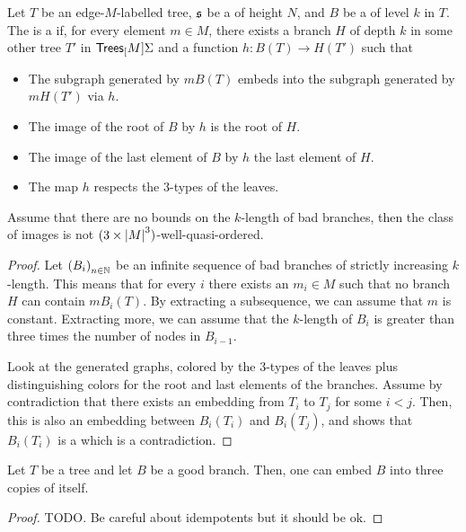 \begin{definition}
    \label{good-bough:def}
    Let $T$ be an edge-$M$-labelled tree, $\mathfrak{s}$ be a 
    of height $N$, and $B$ be a  of level $k$ in $T$.
    The  is a  if, for every element $m \in M$,
    there exists a branch $H$ of depth $k$ in some other tree $T'$ in $\mathsf{Trees}_{[}M]{\Sigma}$
    and a function $h \colon B(T) \to H(T')$ such that
    \begin{itemize}
        \item The subgraph generated by $m B(T)$ embeds into the subgraph generated by $m H(T')$ via $h$.
        \item The image of the root of $B$ by $h$ is the root of $H$.
        \item The image of the last element of $B$ by $h$ the last element of $H$.
        \item The map $h$ respects the $3$-types of the leaves.
    \end{itemize}
\end{definition}

\begin{lemma}
    Assume that there are no bounds on the $k$-length of bad branches, then 
    the class of images is not $(3 \times \left| M \right|^3)$-well-quasi-ordered.
\end{lemma}
\begin{proof}
    Let $\seqof{B_i}$ be an infinite sequence of bad branches of strictly increasing $k$-length.
    This means that for every $i$ there exists an $m_i \in M$ such that
    no branch $H$ can contain $m B_i(T)$. By extracting a subsequence, we can assume that $m$ is constant.
    Extracting more, we can assume that the $k$-length of $B_i$ is greater than three times the
    number of nodes in $B_{i-1}$.

    Look at the generated graphs, colored by the $3$-types of the leaves plus
    distinguishing colors for the root and last elements of the branches. Assume by contradiction that
    there exists an embedding from $T_i$ to $T_j$ for some $i < j$. Then,
    this is also an embedding between $B_i(T_i)$ and $B_i(T_j)$, and
    shows that $B_i(T_i)$ is a  which is a contradiction.
\end{proof}

\begin{lemma}
    Let $T$ be a tree and let $B$ be a good branch. Then, one can embed     
    $B$ into three copies of itself.
\end{lemma}
\begin{proof}
    TODO. Be careful about idempotents but it should be ok.
\end{proof}


